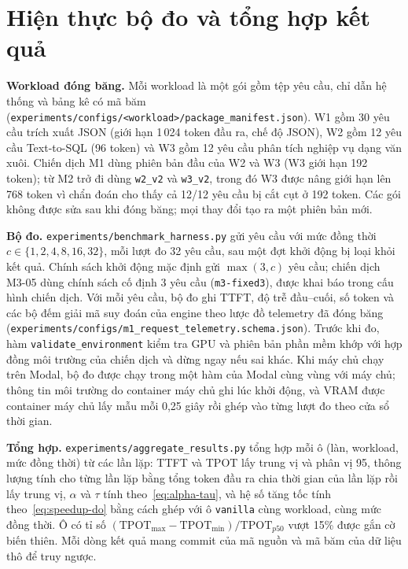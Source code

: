 \section{Hiện thực bộ đo và tổng hợp kết quả}
\label{sec:ht-bo-do}

\textbf{Workload đóng băng.} Mỗi workload là một gói gồm tệp yêu cầu, chỉ dẫn hệ thống và bảng kê có mã băm (\texttt{experiments/configs/<workload>/package\_manifest.json}). W1 gồm 30 yêu cầu trích xuất JSON (giới hạn 1\,024 token đầu ra, chế độ JSON), W2 gồm 12 yêu cầu Text-to-SQL (96 token) và W3 gồm 12 yêu cầu phân tích nghiệp vụ dạng văn xuôi. Chiến dịch M1 dùng phiên bản đầu của W2 và W3 (W3 giới hạn 192 token); từ M2 trở đi dùng \texttt{w2\_v2} và \texttt{w3\_v2}, trong đó W3 được nâng giới hạn lên 768 token vì chẩn đoán cho thấy cả 12/12 yêu cầu bị cắt cụt ở 192 token. Các gói không được sửa sau khi đóng băng; mọi thay đổi tạo ra một phiên bản mới.

\textbf{Bộ đo.} \texttt{experiments/benchmark\_harness.py} gửi yêu cầu với mức đồng thời $c \in \{1, 2, 4, 8, 16, 32\}$, mỗi lượt đo 32 yêu cầu, sau một đợt khởi động bị loại khỏi kết quả. Chính sách khởi động mặc định gửi $\max(3, c)$ yêu cầu; chiến dịch M3-05 dùng chính sách cố định 3 yêu cầu (\texttt{m3-fixed3}), được khai báo trong cấu hình chiến dịch. Với mỗi yêu cầu, bộ đo ghi TTFT, độ trễ đầu--cuối, số token và các bộ đếm giải mã suy đoán của engine theo lược đồ telemetry đã đóng băng (\texttt{experiments/configs/m1\_request\_telemetry.schema.json}). Trước khi đo, hàm \texttt{validate\_environment} kiểm tra GPU và phiên bản phần mềm khớp với hợp đồng môi trường của chiến dịch và dừng ngay nếu sai khác. Khi máy chủ chạy trên Modal, bộ đo được chạy trong một hàm của Modal cùng vùng với máy chủ; thông tin môi trường do container máy chủ ghi lúc khởi động, và VRAM được container máy chủ lấy mẫu mỗi 0,25 giây rồi ghép vào từng lượt đo theo cửa sổ thời gian.

\textbf{Tổng hợp.} \texttt{experiments/aggregate\_results.py} tổng hợp mỗi ô (làn, workload, mức đồng thời) từ các lần lặp: TTFT và TPOT lấy trung vị và phân vị 95, thông lượng tính cho từng lần lặp bằng tổng token đầu ra chia thời gian của lần lặp rồi lấy trung vị, $\alpha$ và $\tau$ tính theo~\eqref{eq:alpha-tau}, và hệ số tăng tốc tính theo~\eqref{eq:speedup-do} bằng cách ghép với ô \texttt{vanilla} cùng workload, cùng mức đồng thời. Ô có tỉ số $(\mathrm{TPOT}_{\max} - \mathrm{TPOT}_{\min})/\mathrm{TPOT}_{p50}$ vượt 15\% được gắn cờ biến thiên. Mỗi dòng kết quả mang commit của mã nguồn và mã băm của dữ liệu thô để truy ngược.


